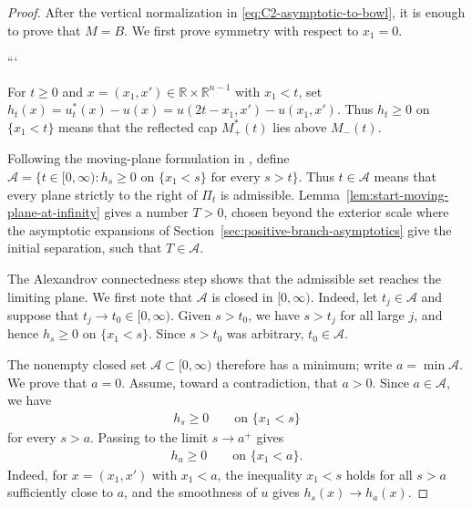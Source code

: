 \documentclass{amsart}
\theoremstyle{plain}
\theoremstyle{mainintrothm}
\theoremstyle{definition}
\begin{document}
\begin{proof}
	After the vertical normalization in \eqref{eq:C2-asymptotic-to-bowl}, it is
	enough to prove that $M=B$.  We first prove symmetry with respect to
	${x_1=0}$.
	
	```
	\medskip
	
	For $t\ge0$ and $x=(x_1,x')\in\mathbb R\times\mathbb R^{n-1}$ with
	$x_1<t$, set $h_t(x)=u_t^*(x)-u(x)=u(2t-x_1,x')-u(x_1,x')$.  Thus
	$h_t\ge0$ on $\{x_1<t\}$ means that the reflected cap $M_+^*(t)$ lies above
	$M_-(t)$.
	
	\medskip
	
	Following the moving-plane formulation in \cite{Paco_2014}, define
	$\mathcal A=\{t\in[0,\infty):h_s\ge0\text{ on }\{x_1<s\}\text{ for every }s>t\}$.
	Thus $t\in\mathcal A$ means that every plane strictly to the right of
	$\Pi_t$ is admissible.  Lemma~\ref{lem:start-moving-plane-at-infinity}
	gives a number $T>0$, chosen beyond the exterior scale where the asymptotic
	expansions of Section~\ref{sec:positive-branch-asymptotics} give the initial
	separation, such that $T\in\mathcal A$.
	
	\medskip
	
	The Alexandrov connectedness step shows that the admissible set reaches the
	limiting plane.  We first note that $\mathcal A$ is closed in
	$[0,\infty)$.  Indeed, let $t_j\in\mathcal A$ and suppose that
	$t_j\to t_0\in[0,\infty)$.  Given $s>t_0$, we have $s>t_j$ for all large
	$j$, and hence $h_s\ge0$ on $\{x_1<s\}$.  Since $s>t_0$ was arbitrary,
	$t_0\in\mathcal A$.
	
	\medskip
	
	The nonempty closed set $\mathcal A\subset[0,\infty)$ therefore has a
	minimum; write $a=\min\mathcal A$.  We prove that $a=0$.  Assume, toward a
	contradiction, that $a>0$.  Since $a\in\mathcal A$, we have
	\begin{align}
		\label{eq:order-for-s-greater-than-a}
		h_s\ge0
		\qquad
		\text{on }\{x_1<s\}
	\end{align}
	for every $s>a$.  Passing to the limit $s\to a^+$ gives
	\begin{align}
		\label{eq:order-at-a}
		h_a\ge0
		\qquad
		\text{on }\{x_1<a\}.
	\end{align}
	Indeed, for $x=(x_1,x')$ with $x_1<a$, the inequality $x_1<s$ holds for all
	$s>a$ sufficiently close to $a$, and the smoothness of $u$ gives
	$h_s(x)\to h_a(x)$.
	
	\medskip
	

\end{proof}
\end{document}
